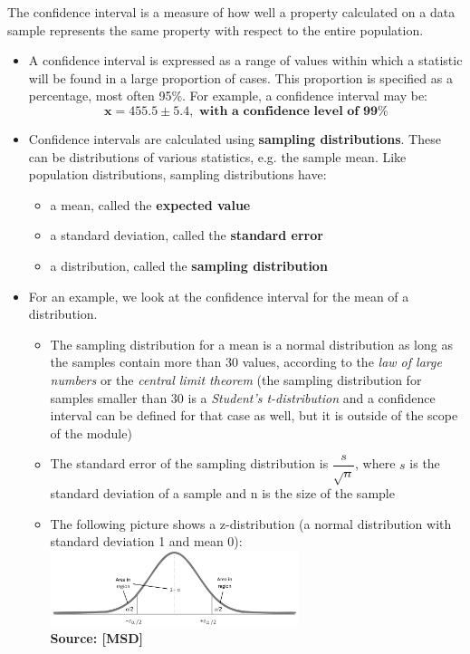 
The confidence interval is a measure of how well a property calculated on a data sample represents the same property with respect to the entire population.  
\begin{itemize}
\item  A confidence interval is expressed as a range of values within which a statistic will be found in a large  proportion of cases. This proportion is specified as a percentage, most often 95\%. For example, a confidence interval may be:
  $$ \mathbf{x = 455.5 \pm 5.4, \text{ with a confidence level of }  99\%} $$
\item Confidence intervals are calculated using \textbf{sampling distributions}. These can be distributions of various statistics, e.g. the sample mean. Like population distributions, sampling distributions have:
  \begin{itemize}
  \item a mean, called the \textbf{expected value}
  \item a standard deviation, called the \textbf{standard error}
  \item a distribution, called the \textbf{sampling distribution}
  \end{itemize}
\newpage
\item For an example, we look at the confidence interval for the mean of a distribution.
  \begin{itemize}
  \item The sampling distribution for a mean is a normal distribution as long as the samples contain more than 30 values, according to the \emph{law of large numbers} or the \emph{central limit theorem} (the sampling distribution for samples smaller than 30 is a \emph{Student's t-distribution} and a confidence interval can be defined for that case as well, but it is outside of the scope of the module) 
  \item The standard error of the sampling distribution is $\dfrac{s}{\sqrt{n}}$, where $s$ is the standard deviation of a sample and n is the size of the sample
  \item The following picture shows a z-distribution (a normal distribution with standard deviation 1 and mean 0):\\ [1ex]
    \includegraphics[width=0.6\textwidth]{confidence_int.png} \\ [-2ex]
    {\fontsize{10}{0}\selectfont \textbf{Source: [MSD]}}
    

\end{itemize}
\end{itemize}
